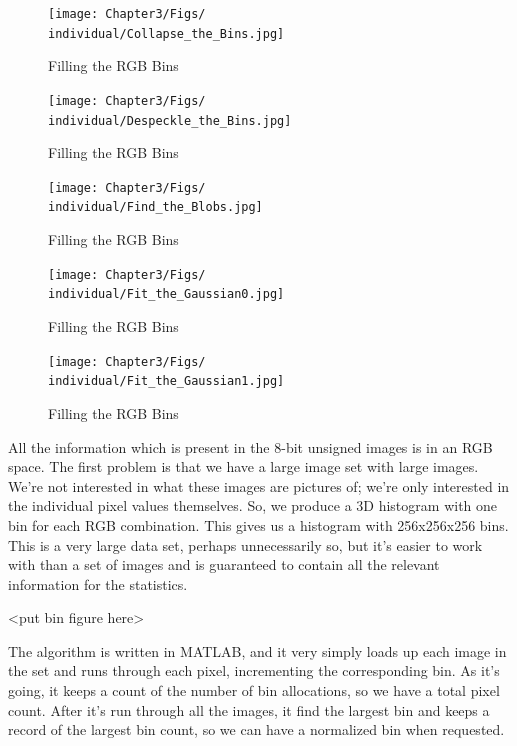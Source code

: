\begin{figure}[h!]
  \centering
    \texttt{[image: Chapter3/Figs/\\individual/Collapse\_the\_Bins.jpg]}
        \caption{Filling the RGB Bins}  \label{fig:Collapse_the_Bins}
    \end{figure}

\begin{figure}[h!]
  \centering
    \texttt{[image: Chapter3/Figs/\\individual/Despeckle\_the\_Bins.jpg]}
        \caption{Filling the RGB Bins}  \label{fig:Despeckle_the_Bins}
    \end{figure}

\begin{figure}[h!]
  \centering
    \texttt{[image: Chapter3/Figs/\\individual/Find\_the\_Blobs.jpg]}
        \caption{Filling the RGB Bins}  \label{fig:Find_the_Blobs}
    \end{figure}

\begin{figure}[h!]
  \centering
    \texttt{[image: Chapter3/Figs/\\individual/Fit\_the\_Gaussian0.jpg]}
        \caption{Filling the RGB Bins}  \label{fig:Fit_the_Gaussian0}
    \end{figure}

\begin{figure}[h!]
  \centering
    \texttt{[image: Chapter3/Figs/\\individual/Fit\_the\_Gaussian1.jpg]}
        \caption{Filling the RGB Bins}  \label{fig:Fit_the_Gaussian1}
    \end{figure}


All the information which is present in the 8-bit unsigned images is in an RGB space. The first problem is that we have a large image set with large images. We're not interested in what these images are pictures of; we're only interested in the individual pixel values themselves. So, we produce a 3D histogram with one bin for each RGB combination. This gives us a histogram with 256x256x256 bins. This is a very large data set, perhaps unnecessarily so, but it's easier to work with than a set of images and is guaranteed to contain all the relevant information for the statistics.

<put bin figure here>

The algorithm is written in MATLAB, and it very simply loads up each image in the set and runs through each pixel, incrementing the corresponding bin. As it's going, it keeps a count of the number of bin allocations, so we have a total pixel count. After it's run through all the images, it find the largest bin and keeps a record of the largest bin count, so we can have a normalized bin when requested.


